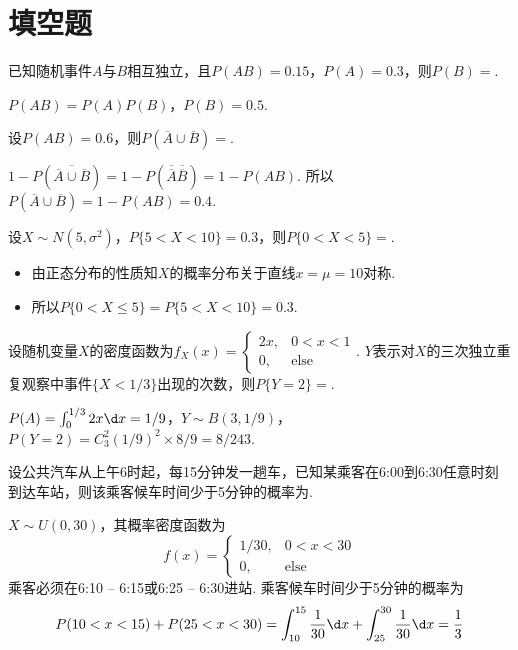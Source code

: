 \section{填空题}

\begin{problem}
    已知随机事件$A$与$B$相互独立，且$P(AB)=0.15$，$P(A)=0.3$，则$P(B)=$.
\end{problem}
\begin{solution}
    $P(AB)=P(A)P(B)$，$P(B)=0.5$.
\end{solution}

\begin{problem}
    设$P(AB)=0.6$，则$P(\overline A\cup\overline B)=$.
\end{problem}
\begin{solution}
    $1-P(\overline{\overline A\cup\overline B})=1-P(\overline{\overline A}\overline{\overline B})=1-P(AB)$. 所以$P(\overline A\cup\overline B)=1-P(AB)=0.4$.
\end{solution}

\begin{problem}
    设$X\sim N(5,\sigma^2)$，$P\{5<X<10\}=0.3$，则$P\{0<X<5\}=$.
\end{problem}
\begin{solution}\leavevmode
    \begin{itemize}
        \item 由正态分布的性质知$X$的概率分布关于直线$x=\mu=10$对称.
        \item 所以$P\{0<X\leq 5\}=P\{5<X<10\}=0.3$.
    \end{itemize}
\end{solution}

\begin{problem}
    设随机变量$X$的密度函数为$f_X(x)=\begin{cases}
        2x, & 0<x<1\\
        0,  & \text{else}
    \end{cases}$. $Y$表示对$X$的三次独立重复观察中事件$\{X<1/3\}$出现的次数，则$P\{Y=2\}=$.
\end{problem}
\begin{solution}
    $P(A)=\int_0^{1/3}2x\d x=1/9$，$Y\sim B(3,1/9)$，$P(Y=2)=C_3^2(1/9)^2\times8/9=8/243$.
\end{solution}

\begin{problem}
    设公共汽车从上午6时起，每15分钟发一趟车，已知某乘客在6:00到6:30任意时刻到达车站，则该乘客候车时间少于5分钟的概率为.
\end{problem}
\begin{solution}
    $X\sim U(0,30)$，其概率密度函数为
    \[f(x)=\begin{cases}
        1/30, & 0<x<30\\0, & \text{else}
    \end{cases}\]
    乘客必须在6:10 -- 6:15或6:25 -- 6:30进站. 乘客候车时间少于5分钟的概率为
    \[P(10<x<15)+P(25<x<30)=\int_{10}^{15}\frac{1}{30}\d x+\int_{25}^{30}\frac{1}{30}\d x=\frac13\]
\end{solution}

